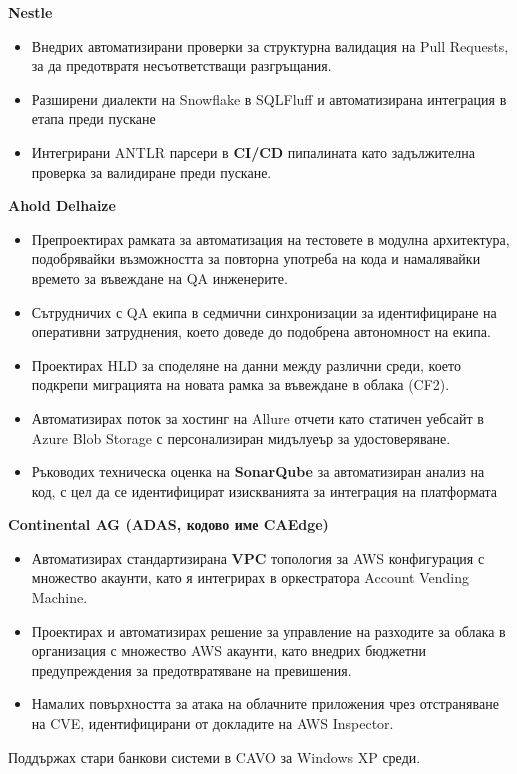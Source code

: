\vspace{1em}
\noindent \textbf{Nestle}
\begin{itemize}[label=\tiny$\bullet$, leftmargin=1em, nosep]
	\item Внедрих автоматизирани проверки за структурна валидация на Pull Requests, за да предотвратя несъответстващи разгръщания.
	\item Разширени диалекти на Snowflake в SQLFluff и автоматизирана интеграция в етапа преди пускане
	\item Интегрирани ANTLR парсери в \textbf{CI/CD} пипалината като задължителна проверка за валидиране преди пускане.
\end{itemize}

\vspace{1em}
\noindent \textbf{Ahold Delhaize}
\begin{itemize}[label=\tiny$\bullet$, leftmargin=1em]
	\item Препроектирах рамката за автоматизация на тестовете в модулна архитектура, подобрявайки възможността за повторна употреба на кода и намалявайки времето за въвеждане на QA инженерите.
	\item Сътрудничих с QA екипа в седмични синхронизации за идентифициране на оперативни затруднения, което доведе до подобрена автономност на екипа.
	\item Проектирах HLD за споделяне на данни между различни среди, което подкрепи миграцията на новата рамка за въвеждане в облака (CF2).
	\item Автоматизирах поток за хостинг на Allure отчети като статичен уебсайт в Azure Blob Storage с персонализиран мидълуеър за удостоверяване.
	\item Ръководих техническа оценка на \textbf{SonarQube} за автоматизиран анализ на код, с цел да се идентифицират изискванията за интеграция на платформата
\end{itemize}

\vspace{1em}
\noindent \textbf{Continental AG (ADAS, кодово име CAEdge)}
\begin{itemize}[label=\tiny$\bullet$, leftmargin=1em]
	\item Автоматизирах стандартизирана \textbf{VPC} топология за AWS конфигурация с множество акаунти, като я интегрирах в оркестратора Account Vending Machine.
	\item Проектирах и автоматизирах решение за управление на разходите за облака в организация с множество AWS акаунти, като внедрих бюджетни предупреждения за предотвратяване на превишения.
	\item Намалих повърхността за атака на облачните приложения чрез отстраняване на CVE, идентифицирани от докладите на AWS Inspector.
\end{itemize}

\vspace{5.0ex}
\small
Поддържах стари банкови системи в CAVO за Windows XP среди.
